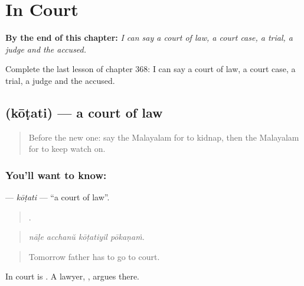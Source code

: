 
\chapter{In Court}
\label{ch:ml-in-court}

\begin{chapteropening}
\textbf{By the end of this chapter:} \emph{I can say a court of law, a court case, a trial, a judge and the accused.}

Complete the last lesson of chapter 368: I can say a court of law, a court case, a trial, a judge and the accused.
\end{chapteropening}

\section[\texorpdfstring{\ml{കോടതി} (kōṭati)}{കോടതി (kōṭati)}]{ (kōṭati) — a court of law}

\label{lesson:ML-C368-kotati}



\begin{quote}
Before the new one: say the Malayalam for to kidnap, then the Malayalam for to keep watch on.
\end{quote}

\subsection*{You'll want to know: }
\textbf{} — \emph{kōṭati} — \textquotedblleft{}a court of law\textquotedblright{}.

\begin{quote}
   .
\end{quote}

\begin{quote}
\emph{nāḷe acchanŭ kōṭatiyil pōkaṇaṁ.}
\end{quote}

\begin{quote}
Tomorrow father has to go to court.
\end{quote}

In court is . A lawyer, , argues there.

